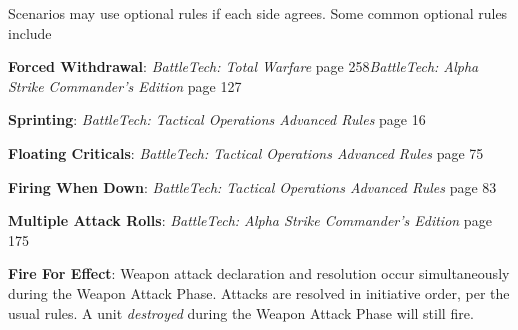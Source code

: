 Scenarios may use optional rules if each side agrees.
Some common optional rules include

\begin{description}

\item {\bfseries Forced Withdrawal}: \emph{BattleTech: Total Warfare} page 258\emph{BattleTech: Alpha Strike Commander's Edition} page 127

\item {\bfseries Sprinting}: \emph{BattleTech: Tactical Operations Advanced Rules} page 16

\item {\bfseries Floating Criticals}: \emph{BattleTech: Tactical Operations Advanced Rules} page 75

\item {\bfseries Firing When Down}: \emph{BattleTech: Tactical Operations Advanced Rules} page 83

\item {\bfseries Multiple Attack Rolls}: \emph{BattleTech: Alpha Strike Commander's Edition} page 175

\item {\bfseries Fire For Effect}: Weapon attack declaration and resolution occur simultaneously during the Weapon Attack Phase.
Attacks are resolved in initiative order, per the usual rules.
A unit \emph{destroyed} during the Weapon Attack Phase will still fire.

\end{description}
